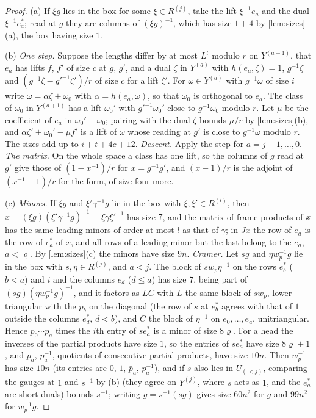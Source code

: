 \begin{proof}
(a) If $\xi g$ lies in the box for some $\xi\in R^{(j)}$, take the lift $\xi^{-1}e_a$ and the dual $\xi^{-1}e^*_a$; read at $g$ they are columns of $(\xi g)^{-1}$, which has size $1+4$ by \cref{lem:sizes}(a), the box having size $1$.

(b) \emph{One step.} Suppose the lengths differ by at most $L^t$ modulo $r$ on $Y^{(a+1)}$, that $e_a$ has lifts $f$, $f'$ of size $c$ at $g$, $g'$, and a dual $\zeta$ in $Y^{(a)}$ with $h(e_a,\zeta)=1$, $g^{-1}\zeta$ and
$(g^{-1}\zeta-g'^{-1}\zeta')/r$ of size $c$ for a lift $\zeta'$. For $\omega\in Y^{(a)}$ with $g^{-1}\omega$ of size $i$ write $\omega=\alpha\zeta+\omega_0$ with $\alpha=h(e_a,\omega)$, so that $\omega_0$ is orthogonal to $e_a$. The class of $\omega_0$ in
$Y^{(a+1)}$ has a lift $\omega_0'$ with $g'^{-1}\omega_0'$ close to $g^{-1}\omega_0$ modulo $r$. Let $\mu$ be the coefficient of $e_a$ in $\omega_0'-\omega_0$; pairing with the dual $\zeta$ bounds $\mu/r$ by \cref{lem:sizes}(b), and $\alpha\zeta'+\omega_0'-\mu f'$
is a lift of $\omega$ whose reading at $g'$ is close to $g^{-1}\omega$ modulo $r$. The sizes add up to $i+t+4c+12$. \emph{Descent.} Apply the step for $a=j-1,\dots,0$. \emph{The matrix.} On the whole space a class has one lift, so the
columns of $g$ read at $g'$ give those of $(1-x^{-1})/r$ for $x=g^{-1}g'$, and $(x-1)/r$ is the adjoint of $(x^{-1}-1)/r$ for the form, of size four more.

(c) \emph{Minors.} If $\xi g$ and $\xi'\gamma^{-1}g$ lie in the box with $\xi,\xi'\in R^{(l)}$, then $x=(\xi g)(\xi'\gamma^{-1}g)^{-1}=\xi\gamma\xi'^{-1}$ has size $7$, and the matrix of frame products of $x$ has the same leading minors of order at
most $l$ as that of $\gamma$; in $Jx$ the row of $e_a$ is the row of $e^*_a$ of $x$, and all rows of a leading minor but the last belong to the $e_a$, $a<\varrho$. By \cref{lem:sizes}(c) the minors have size $9n$. \emph{Cramer.} Let
$sg$ and $\eta w_p^{-1}g$ lie in the box with $s,\eta\in R^{(j)}$, and $a<j$. The block of $sw_p\eta^{-1}$ on the rows $e^*_b$ ($b<a$) and $i$ and the columns $e_d$ ($d\le a$) has size $7$, being part of
$(sg)(\eta w_p^{-1}g)^{-1}$, and it factors as $LC$ with $L$ the same block of $sw_p$, lower triangular with the $p_b$ on the diagonal (the row of $s$ at $e^*_b$ agrees with that of $1$ outside the columns $e^*_d$, $d<b$), and
$C$ the block of $\eta^{-1}$ on $e_0,\dots,e_a$, unitriangular. Hence $p_0\cdots p_a$ times the $i$th entry of $se^*_a$ is a minor of size $8\varrho$. For a head the inverses of the partial products have size $1$, so the entries of $se^*_a$
have size $8\varrho+1$, and $p_a$, $p_a^{-1}$, quotients of consecutive partial products, have size $10n$. Then $w_p^{-1}$ has size $10n$ (its entries are $0$, $1$, $\bar p_a$, $p_a^{-1}$), and if $s$ also lies in $U_{(<j)}$, comparing the
gauges at $1$ and $s^{-1}$ by (b) (they agree on $Y^{(j)}$, where $s$ acts as $1$, and the $e^*_a$ are short duals) bounds $s^{-1}$; writing $g=s^{-1}(sg)$ gives size $60n^2$ for $g$ and $99n^2$ for $w_p^{-1}g$.
\end{proof}


